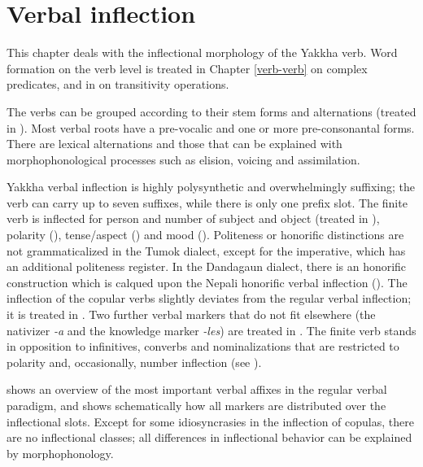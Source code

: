 ﻿\chapter{Verbal inflection}\label{verbalmorph}

This chapter deals with the inflectional morphology of the Yakkha verb. Word formation on the verb level is treated in  Chapter \ref{verb-verb} on complex predicates, and in  on transitivity operations.

The verbs can be grouped according to their stem forms and alternations (treated in ). Most verbal roots have a pre-vocalic and one or more pre-consonantal  forms. There are lexical alternations and those that can be explained with morphophonological processes such as elision, voicing and assimilation. 

Yakkha verbal inflection is highly polysynthetic and overwhelmingly suffixing; the verb can carry up to seven suffixes, while there is only one prefix slot. The finite verb is  inflected for person and number of subject and object (treated in ), polarity (),  tense/aspect () and  mood (). Politeness or honorific distinctions are not grammaticalized in the Tumok dialect, except for the imperative, which has an additional politeness register. In the Dandagaun dialect,  there is an honorific construction which is calqued upon the Nepali honorific verbal inflection  (). The inflection of the copular verbs slightly deviates from the regular verbal inflection; it is treated in . Two further verbal markers that do not fit elsewhere (the nativizer \emph{-a} and the knowledge marker \emph{-les})  are treated in . The finite verb stands in opposition to infinitives, converbs and nominalizations that are restricted to polarity and, occasionally, number inflection (see ). 



 shows an overview of the most important verbal affixes in the regular verbal paradigm, and  shows schematically how all  markers are distributed over the inflectional slots. Except for some idiosyncrasies in the inflection of copulas, there are no inflectional classes; all differences in inflectional behavior can be explained by morphophonology. 


